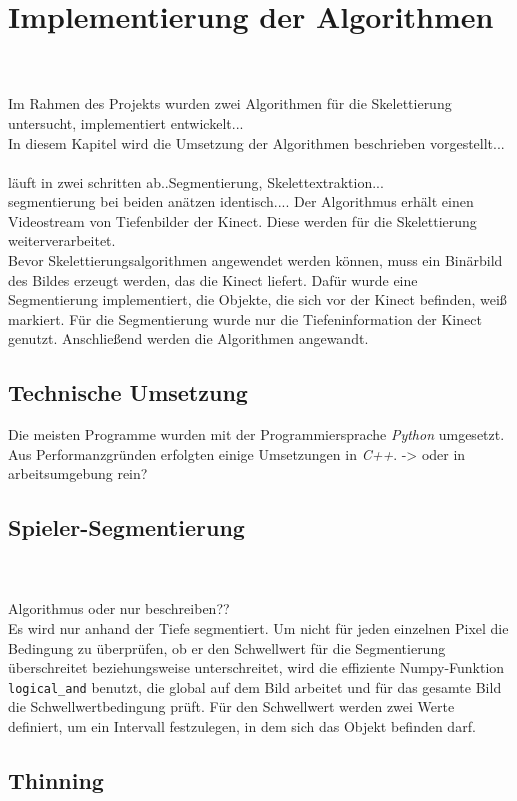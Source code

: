 \chapter{Implementierung der Algorithmen}
\\\\
Im Rahmen des Projekts wurden zwei Algorithmen für die Skelettierung untersucht, implementiert entwickelt...\\
In diesem Kapitel wird die Umsetzung der Algorithmen beschrieben vorgestellt...\\\\
läuft in zwei schritten ab..Segmentierung, Skelettextraktion...\\
segmentierung bei beiden anätzen identisch....
Der Algorithmus erhält einen Videostream von Tiefenbilder der Kinect. Diese werden für die
Skelettierung weiterverarbeitet. \\
Bevor Skelettierungsalgorithmen angewendet werden können, muss ein Binärbild des Bildes erzeugt werden, 
das die Kinect liefert. Dafür wurde eine Segmentierung implementiert, die Objekte, die sich vor der
Kinect befinden, weiß markiert. Für die Segmentierung wurde nur die Tiefeninformation der Kinect genutzt.
Anschließend werden die Algorithmen angewandt. 
\section{Technische Umsetzung}
Die meisten Programme wurden mit der Programmiersprache \emph{Python} umgesetzt. Aus Performanzgründen 
erfolgten einige Umsetzungen in \emph{C++}. -> oder in arbeitsumgebung rein?\\
\section{Spieler-Segmentierung}
\\\\
Algorithmus oder nur beschreiben??\\
Es wird nur anhand der Tiefe segmentiert. Um nicht für jeden einzelnen Pixel die Bedingung zu überprüfen, ob er den Schwellwert für die Segmentierung überschreitet beziehungsweise unterschreitet, wird die effiziente Numpy-Funktion \texttt{logical\_and} benutzt, die global auf dem Bild arbeitet und für das gesamte Bild die Schwellwertbedingung prüft. Für den Schwellwert werden zwei 
Werte definiert, um ein Intervall festzulegen, in dem sich das Objekt befinden darf. 
\section{Thinning}  %
